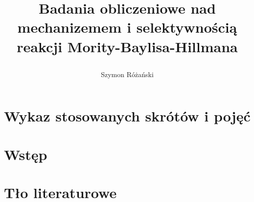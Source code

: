 \documentclass{article}
\title{
  Badania obliczeniowe nad mechanizemem i selektywnością reakcji Mority-Baylisa-Hillmana

}
\author{Szymon Różański}
\begin{document}
\maketitle
\section{Wykaz stosowanych skrótów i pojęć}


\section{Wstęp}

\section{Tło literaturowe}

\end{document}

